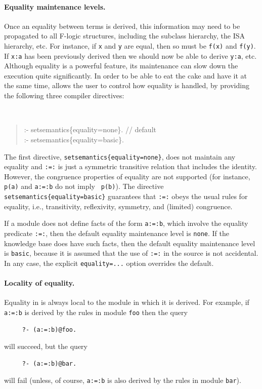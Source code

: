 \documentclass[11pt]{article}
\newcommand{\ERGO}{\mbox{\smaller{\ensuremath{\cal{E}}\smaller{{\sc{RGO}}}}}\xspace}
\newcommand{\FLSYSTEM}{\ERGO}
\newcommand{\fl}{\mbox{F-logic}\xspace}
\begin{document}
\paragraph{Equality maintenance levels.}
Once an equality between terms is derived, this information may need to be
propagated to all \fl 
structures, including the subclass hierarchy, the ISA hierarchy, etc.
For instance, if {\tt x} and {\tt y} are equal, then so must be {\tt f(x)}
and {\tt f(y)}. If {\tt x:a} has been previously derived then we should now
be able to derive {\tt y:a}, etc. Although equality is a powerful
feature, its maintenance can slow down the execution quite significantly.
In order to be able to eat the cake and have it at the same time, \FLSYSTEM
allows the user to control how equality is handled,
by providing the following three compiler directives:
{\tt
\begin{quote}
:- setsemantics\{equality=none\}.  // default\\
:- setsemantics\{equality=basic\}.
\end{quote}
}

\noindent
The first directive, \mbox{\tt setsemantics\{equality=none\}}, does not
maintain any equality and {\tt :=:} is just a symmetric transitive relation
that includes the identity. However,
the congruence properties of equality are not
supported (for instance, {\tt p(a)} and {\tt a:=:b} do not imply {\tt
  p(b)}). The directive
\mbox{\tt setsemantics\{equality=basic\}} guarantees that {\tt :=:} obeys the
usual rules for equality, i.e., transitivity, reflexivity,
symmetry, and (limited) congruence.

If a \FLSYSTEM module does not define facts of the form {\tt a:=:b}, which
involve the equality predicate {\tt :=:}, then the default equality
maintenance level is {\tt none}. If the knowledge base does have such facts,
then the default equality maintenance level is {\tt basic}, because it is
assumed that the use of {\tt :=:} in the source is not accidental.
In any case, the explicit {\tt equality=...} option overrides the default.

\paragraph{Locality of equality.}
Equality in \FLSYSTEM is always local to the module in which it is derived.
For example, if {\tt a:=:b} is derived by the rules in module {\tt foo}
then the query
\begin{verbatim}
     ?- (a:=:b)@foo.  
\end{verbatim}
will succeed, but the query
\begin{verbatim}
     ?- (a:=:b)@bar.  
\end{verbatim}
will fail (unless, of course, {\tt a:=:b} is also derived by the rules in
module {\tt bar}).
\end{document}
